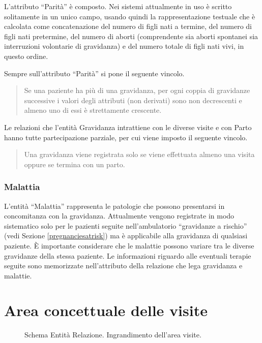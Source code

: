 L'attributo \enquote{Parità} è composto.
Nei sistemi attualmente in uso è scritto solitamente in un unico campo, usando quindi la rappresentazione testuale che è calcolata come concatenazione del numero di figli nati a termine, del numero di figli nati pretermine, del numero di aborti (comprendente sia aborti spontanei sia interruzioni volontarie di gravidanza) e del numero totale di figli nati vivi, in questo ordine.

Sempre sull'attributo \enquote{Parità} si pone il seguente vincolo.
\begin{quote}
Se una paziente ha più di una gravidanza, per ogni coppia di gravidanze successive i valori degli attributi (non derivati) sono non decrescenti e almeno uno di essi è strettamente crescente.
\end{quote}

Le relazioni che l'entità Gravidanza intrattiene con le diverse visite e con Parto hanno tutte partecipazione parziale, per cui viene imposto il seguente vincolo.
\begin{quote}
Una gravidanza viene registrata solo se viene effettuata almeno una visita oppure se termina con un parto.
\end{quote}

\subsubsection{Malattia}

L'entità \enquote{Malattia} rappresenta le patologie che possono presentarsi in concomitanza con la gravidanza.
Attualmente vengono registrate in modo sistematico solo per le pazienti seguite nell'ambulatorio \enquote{gravidanze a rischio} (vedi Sezione \ref{pregnanciesatrisk}) ma è applicabile alla gravidanza di qualsiasi paziente.
È importante considerare che le malattie possono variare tra le diverse gravidanze della stessa paziente.
Le informazioni riguardo alle eventuali terapie seguite sono memorizzate nell'attributo della relazione che lega gravidanza e malattie.

\section{Area concettuale delle visite}
\label{visitsconceptual}

\begin{figure}
    \centering
    
    \caption{Schema Entità Relazione. Ingrandimento dell'area visite.}
    \label{visitserdiagram}
\end{figure}


